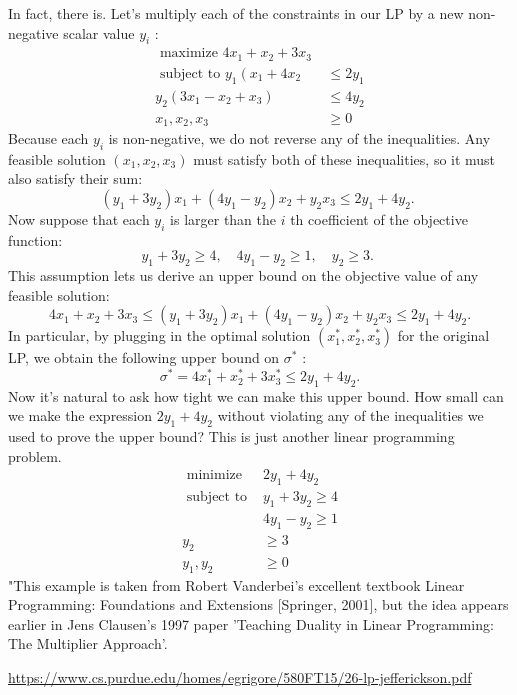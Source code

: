 In fact, there is. Let's multiply each of the constraints in our LP by a new non-negative scalar value $y_{i}$ :
$$
\begin{aligned}
\text { maximize } 4 x_{1}+x_{2}+3 x_{3} & \\
\text { subject to } y_{1}\left(x_{1}+4 x_{2} \quad\right.& \leq 2 y_{1} \\
y_{2}\left(3 x_{1}-x_{2}+x_{3}\right) & \leq 4 y_{2} \\
x_{1}, x_{2}, x_{3} & \geq 0
\end{aligned}
$$
Because each $y_{i}$ is non-negative, we do not reverse any of the inequalities. Any feasible solution $\left(x_{1}, x_{2}, x_{3}\right)$ must satisfy both of these inequalities, so it must also satisfy their sum:
$$
\left(y_{1}+3 y_{2}\right) x_{1}+\left(4 y_{1}-y_{2}\right) x_{2}+y_{2} x_{3} \leq 2 y_{1}+4 y_{2} \text {. }
$$
Now suppose that each $y_{i}$ is larger than the $i$ th coefficient of the objective function:
$$
y_{1}+3 y_{2} \geq 4, \quad 4 y_{1}-y_{2} \geq 1, \quad y_{2} \geq 3 \text {. }
$$
This assumption lets us derive an upper bound on the objective value of any feasible solution:
$$
4 x_{1}+x_{2}+3 x_{3} \leq\left(y_{1}+3 y_{2}\right) x_{1}+\left(4 y_{1}-y_{2}\right) x_{2}+y_{2} x_{3} \leq 2 y_{1}+4 y_{2} .
$$
In particular, by plugging in the optimal solution $\left(x_{1}^{*}, x_{2}^{*}, x_{3}^{*}\right)$ for the original LP, we obtain the following upper bound on $\sigma^{*}$ :
$$
\sigma^{*}=4 x_{1}^{*}+x_{2}^{*}+3 x_{3}^{*} \leq 2 y_{1}+4 y_{2} .
$$
Now it's natural to ask how tight we can make this upper bound. How small can we make the expression $2 y_{1}+4 y_{2}$ without violating any of the inequalities we used to prove the upper bound? This is just another linear programming problem.
$$
\begin{array}{rr}
\text { minimize } & 2 y_{1}+4 y_{2} \\
\text { subject to } & y_{1}+3 y_{2} \geq 4 \\
& 4 y_{1}-y_{2} \geq 1 \\
y_{2} & \geq 3 \\
y_{1}, y_{2} & \geq 0
\end{array}
$$
"This example is taken from Robert Vanderbei's excellent textbook Linear Programming: Foundations and Extensions [Springer, 2001], but the idea appears earlier in Jens Clausen's 1997 paper 'Teaching Duality in Linear Programming: The Multiplier Approach'.

\url{https://www.cs.purdue.edu/homes/egrigore/580FT15/26-lp-jefferickson.pdf}




